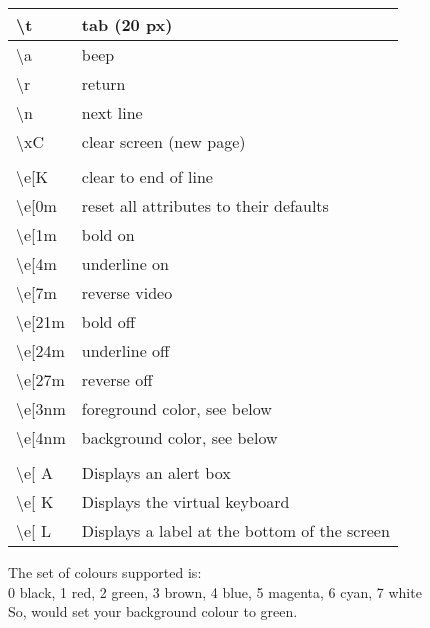 \begin{tabular}{|l|l|}
\hline
\textbackslash t & tab (20 px) \\
\hline
\textbackslash a  & beep \\
\hline
\textbackslash r  & return \\
\hline
\textbackslash n  & next line \\
\hline
\textbackslash xC  & clear screen (new page) \\
 & \\
\hline
\textbackslash e[K   & clear to end of line \\
\hline
\textbackslash e[0m  & reset all attributes to their defaults \\
\hline
\textbackslash e[1m  & bold on \\
\hline
\textbackslash e[4m  & underline on \\
\hline
\textbackslash e[7m  & reverse video \\
\hline
\textbackslash e[21m  & bold off \\
\hline
\textbackslash e[24m  & underline off \\
\hline
\textbackslash e[27m  & reverse off \\
\hline
\textbackslash e[3nm  & foreground color, see below\\
\hline
\textbackslash e[4nm  & background color, see below\\
& \\
\hline
\textbackslash e[ A  & Displays an alert box \\
\hline
\textbackslash e[ K  & Displays the virtual keyboard \\
\hline
\textbackslash e[ L  & Displays a label at the bottom of the screen \\
\hline

\end{tabular}

\absatz

The set of colours supported is:\\
0 black, 1 red, 2 green, 3 brown, 4 blue, 5 magenta, 6 cyan, 7 white\\
So, \Co{\textbackslash e[42m} would set your background colour to green.
